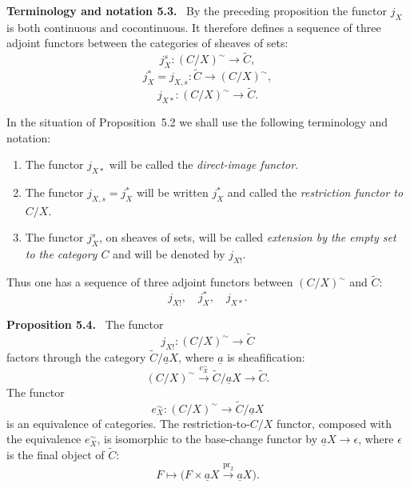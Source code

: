 \documentclass[11pt]{article}
\newcommand{\pr}{\operatorname{pr}}
\newenvironment{statement}[1]{\par\medskip\noindent\textbf{#1.}\ }{\par\medskip}
\newenvironment{remarktext}[1]{\par\medskip\noindent\textbf{#1.}\ }{\par\medskip}
\begin{document}
\begin{remarktext}{Terminology and notation 5.3}
By the preceding proposition the functor \(j_X\) is both continuous and cocontinuous. It therefore defines a sequence of three adjoint functors between the categories of sheaves of sets:
\[
j_X^s:(C/X)^{\sim}\to\widetilde C,
\]
\[
j_X^*=j_{X,s}:\widetilde C\to(C/X)^{\sim},
\]
\[
j_{X*}:(C/X)^{\sim}\to\widetilde C.
\]

In the situation of Proposition~5.2 we shall use the following terminology and notation:
\begin{enumerate}[label=\arabic*)]
\item The functor \(j_{X*}\) will be called the \emph{direct-image functor}.
\item The functor \(j_{X,s}=j_X^*\) will be written \(j_X^*\) and called the \emph{restriction functor to \(C/X\)}.
\item The functor \(j_X^s\), on sheaves of sets, will be called \emph{extension by the empty set to the category \(C\)} and will be denoted by \(j_{X!}\).
\end{enumerate}
Thus one has a sequence of three adjoint functors between \((C/X)^{\sim}\) and \(\widetilde C\):
\[
j_{X!},\quad j_X^*,\quad j_{X*}.
\]
\end{remarktext}

\begin{statement}{Proposition 5.4}
The functor
\[
j_{X!}:(C/X)^{\sim}\to\widetilde C
\]
factors through the category \(\widetilde C/\underline aX\), where \(\underline a\) is sheafification:
\[
(C/X)^{\sim}\xrightarrow{e_X^{\sim}}\widetilde C/\underline aX\to\widetilde C.
\]
The functor
\[
e_X^{\sim}:(C/X)^{\sim}\to\widetilde C/\underline aX
\]
is an equivalence of categories. The restriction-to-\(C/X\) functor, composed with the equivalence \(e_X^{\sim}\), is isomorphic to the base-change functor by \(\underline aX\to\epsilon\), where \(\epsilon\) is the final object of \(\widetilde C\):
\[
F\longmapsto\bigl(F\times\underline aX\xrightarrow{\pr_2}\underline aX\bigr).
\]
\end{statement}
\end{document}
